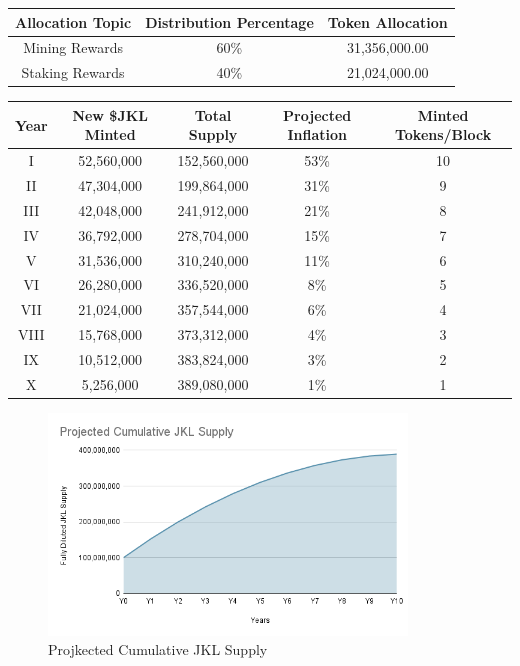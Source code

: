 \documentclass[11pt, nofootinbib]{article}
\begin{document}
\begin{center}
\begin{tabular}{|c c c|}
 \hline
 Allocation Topic & Distribution Percentage & Token Allocation \\ [0.5ex] 
 \hline\hline
 Mining Rewards & 60\%  & 31,356,000.00 \\ 
 \hline
 Staking Rewards  & 40\% & 21,024,000.00 \\
 \hline
\end{tabular}
\end{center}


\begin{center}
\begin{tabular}{|c c c c c|} 
 \hline
 Year & New \$JKL Minted & Total Supply &   Projected Inflation & Minted Tokens/Block \\ [0.5ex] 
 \hline\hline
 I & 52,560,000 & 152,560,000 & 53\% & 10 \\ 
 \hline
 II & 47,304,000 & 199,864,000 & 31\% & 9 \\
 \hline
 III & 42,048,000 & 241,912,000 & 21\% & 8 \\   
\hline
 IV & 36,792,000 & 278,704,000 & 15\% & 7 \\  
\hline
 V & 31,536,000 & 310,240,000  & 11\% & 6 \\  
\hline
 VI & 26,280,000 & 336,520,000  & 8\% & 5 \\  
\hline
 VII & 21,024,000 & 357,544,000 & 6\% & 4 \\  
\hline
 VIII & 15,768,000 & 373,312,000 & 4\% & 3 \\ 
\hline
 IX & 10,512,000 & 383,824,000 & 3\% & 2 \\ 
\hline
 X & 5,256,000 & 389,080,000 & 1\% & 1 \\
 \hline
\end{tabular}
\end{center}

\begin{center}
\begin{figure}
\centering
\includegraphics[width=0.85\textwidth]{chart1.png}
\caption{Projkected Cumulative JKL Supply}
\end{figure}
\end{center}
\end{document}
